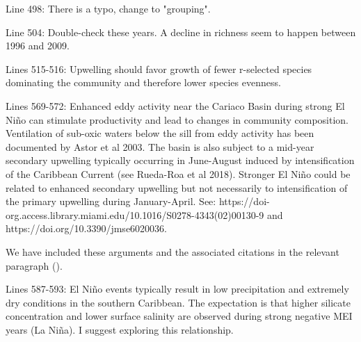 \documentclass[12pt,english]{reviewresponse}
\begin{document}
\begin{revcomment}
Line 498: There is a typo, change to "grouping".
\end{revcomment}
\begin{revresponse}
\end{revresponse}

\begin{revcomment}
Line 504: Double-check these years. A decline in richness seem to happen between 1996 and 2009.
\end{revcomment}
\begin{revresponse}
\end{revresponse}

\begin{revcomment}
Lines 515-516: Upwelling should favor growth of fewer r-selected species dominating the community and therefore lower species evenness.
\end{revcomment}
\begin{revresponse}
\end{revresponse}

\begin{revcomment}
Lines 569-572: Enhanced eddy activity near the Cariaco Basin during strong El Niño can stimulate productivity and lead to changes in community composition. Ventilation of sub-oxic waters below the sill from eddy activity has been documented by Astor et al 2003. The basin is also subject to a mid-year secondary upwelling typically occurring in June-August induced by intensification of the Caribbean Current (see Rueda-Roa et al 2018). Stronger El Niño could be related to enhanced secondary upwelling but not necessarily to intensification of the primary upwelling during January-April. See: https://doi-org.access.library.miami.edu/10.1016/S0278-4343(02)00130-9 and https://doi.org/10.3390/jmse6020036.
\end{revcomment}
\begin{revresponse} 
We have included these arguments and the associated citations in the relevant paragraph ().
\end{revresponse}

\begin{revcomment}
Lines 587-593: El Niño events typically result in low precipitation and extremely dry conditions in the southern Caribbean. The expectation is that higher silicate concentration and lower surface salinity are observed during strong negative MEI years (La Niña). I suggest exploring this relationship.
\end{revcomment}
\begin{revresponse}
\end{revresponse}
\end{document}
